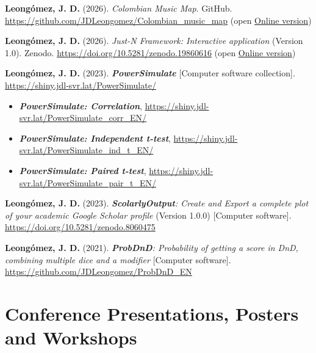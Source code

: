 \documentclass[11pt,a4paper,]{awesome-cv}
\providecommand{\tightlist}{%
	\setlength{\itemsep}{0pt}\setlength{\parskip}{0pt}}
\begin{document}
\begingroup
  \footnotesize
  \setlength{\parindent}{-0.5in}
  \setlength{\leftskip}{0.5in}

\textbf{Leongómez, J. D.} (2026). \emph{Colombian Music Map}. GitHub.
\url{https://github.com/JDLeongomez/Colombian_music_map} (open
\href{https://jdleongomez.github.io/Colombian_music_map/}{Online
version})

\textbf{Leongómez, J. D.} (2026). \emph{Just-N Framework: Interactive
application} (Version 1.0). Zenodo.
\url{https://doi.org/10.5281/zenodo.19860616} (open
\href{https://jdleongomez.github.io/just_n_app/}{Online version})

\textbf{Leongómez, J. D.} (2023). \textbf{\emph{PowerSimulate}}
{[}Computer software collection{]}.
\url{https://shiny.jdl-svr.lat/PowerSimulate/}

\vspace{-2mm}

\begin{itemize}
\tightlist
\item
  \textbf{\emph{PowerSimulate: Correlation}},
  \url{https://shiny.jdl-svr.lat/PowerSimulate_corr_EN/}
\item
  \textbf{\emph{PowerSimulate: Independent t-test}},
  \url{https://shiny.jdl-svr.lat/PowerSimulate_ind_t_EN/}
\item
  \textbf{\emph{PowerSimulate: Paired t-test}},
  \url{https://shiny.jdl-svr.lat/PowerSimulate_pair_t_EN/}
\end{itemize}

\textbf{Leongómez, J. D.} (2023). \emph{\textbf{ScolarlyOutput}: Create
and Export a complete plot of your academic Google Scholar profile}
(Version 1.0.0) {[}Computer software{]}.
\href{https://github.com/JDLeongomez/ScholarlyOutput}{https://doi.org/10.5281/zenodo.8060475}

\textbf{Leongómez, J. D.} (2021). \emph{\textbf{ProbDnD}: Probability of
getting a score in DnD, combining multiple dice and a modifier}
{[}Computer software{]}. \url{https://github.com/JDLeongomez/ProbDnD_EN}

\endgroup

\section{Conference Presentations, Posters and
Workshops}\label{conference-presentations-posters-and-workshops}

\begingroup
  \footnotesize
  \setlength{\parindent}{-0.5in}
  \setlength{\leftskip}{0.5in}
\end{document}
